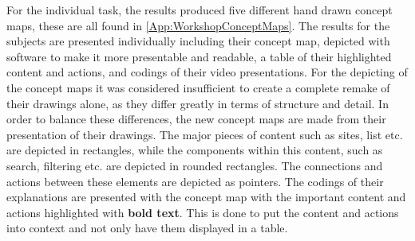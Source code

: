 For the individual task, the results produced five different hand drawn concept maps, these are all found in \autoref{App:WorkshopConceptMaps}. The results for the subjects are presented individually including their concept map, depicted with software to make it more presentable and readable, a table of their highlighted content and actions, and codings of their video presentations. For the depicting of the concept maps it was considered insufficient to create a complete remake of their drawings alone, as they differ greatly in terms of structure and detail. In order to balance these differences, the new concept maps are made from their presentation of their drawings. The major pieces of content such as sites, list etc. are depicted in rectangles, while the components within this content, such as search, filtering etc. are depicted in rounded rectangles. The connections and actions between these elements are depicted as pointers. The codings of their explanations are presented with the concept map with the important content and actions highlighted with \textbf{bold text}. This is done to put the content and actions into context and not only have them displayed in a table.


